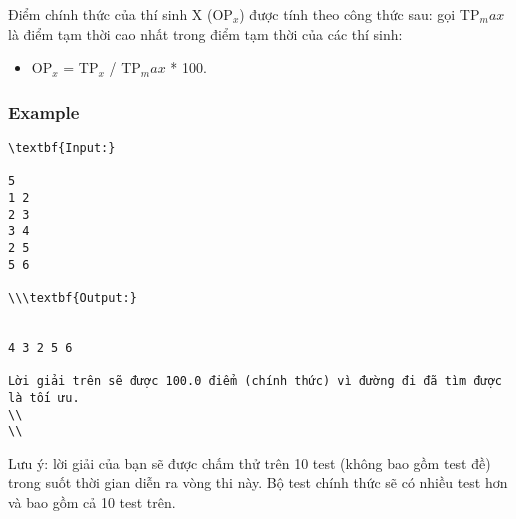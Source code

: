 Điểm chính thức của thí sinh X (OP$_x$) được tính theo công thức sau: gọi TP$_max$ là điểm tạm thời cao nhất trong điểm tạm thời của các thí sinh:
\begin{itemize}
	\item OP$_x$ = TP$_x$ / TP$_max$ * 100.
\end{itemize}

\subsubsection{Example}
\begin{verbatim}
\textbf{Input:}

5
1 2
2 3
3 4
2 5
5 6

\\\textbf{Output:}


4 3 2 5 6 

Lời giải trên sẽ được 100.0 điểm (chính thức) vì đường đi đã tìm được là tối ưu. 
\\
\\\end{verbatim}

Lưu ý: lời giải của bạn sẽ được chấm thử trên 10 test (không bao gồm test đề) trong suốt thời gian diễn ra vòng thi này. Bộ test chính thức sẽ có nhiều test hơn và bao gồm cả 10 test trên.
